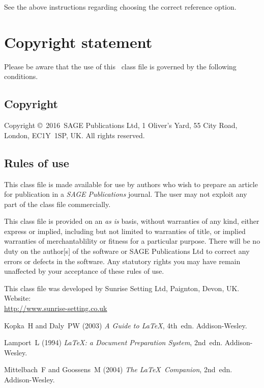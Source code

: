 \documentclass[Afour,sageh,times]{sagej}
\def\volumeyear{2016}
\begin{document}
See the above instructions regarding choosing the correct reference option.

%

\section{Copyright statement}
Please  be  aware that the use of  this \LaTeXe\ class file is
governed by the following conditions.

\subsection{Copyright}
Copyright \copyright\ \volumeyear\ SAGE Publications Ltd,
1 Oliver's Yard, 55 City Road, London, EC1Y~1SP, UK. All
rights reserved.

\subsection{Rules of use}
This class file is made available for use by authors who wish to
prepare an article for publication in a \textit{SAGE Publications} journal.
The user may not exploit any
part of the class file commercially.

This class file is provided on an \textit{as is}  basis, without
warranties of any kind, either express or implied, including but
not limited to warranties of title, or implied  warranties of
merchantablility or fitness for a particular purpose. There will
be no duty on the author[s] of the software or SAGE Publications Ltd
to correct any errors or defects in the software. Any
statutory  rights you may have remain unaffected by your
acceptance of these rules of use.

\begin{acks}
This class file was developed by Sunrise Setting Ltd,
Paignton, Devon, UK. Website:\\
\url{http://www.sunrise-setting.co.uk}
\end{acks}

\begin{thebibliography}{99}
Kopka~H and Daly~PW (2003) \textit{A Guide to \LaTeX}, 4th~edn.
Addison-Wesley.

Lamport~L (1994) \textit{\LaTeX: a Document Preparation System},
2nd~edn. Addison-Wesley.

Mittelbach~F and Goossens~M (2004) \textit{The \LaTeX\ Companion},
2nd~edn. Addison-Wesley.

\end{thebibliography}
\end{document}
